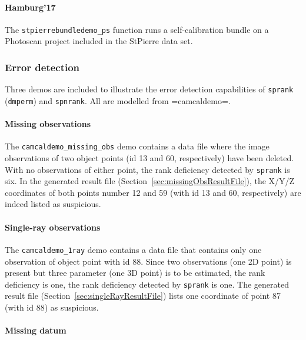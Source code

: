 \documentclass{article}
\begin{document}
\paragraph{\sc Hamburg'17}
The \texttt{stpierrebundledemo\_ps} function runs a self-calibration
bundle on a Photoscan project included in the StPierre data set.

\subsubsection{Error detection}

Three demos are included to illustrate the error detection
capabilities of \texttt{sprank} (\texttt{dmperm}) and
\texttt{spnrank}. All are modelled from =camcaldemo=.

\paragraph{Missing observations}

The \texttt{camcaldemo\_missing\_obs} demo contains a data file where
the image observations of two object points (id 13 and 60,
respectively) have been deleted. With no observations of either point,
the rank deficiency detected by \texttt{sprank} is six. In the
generated result file (Section~\ref{sec:missingObsResultFile}), the
X/Y/Z coordinates of both points number 12 and 59 (with id 13 and 60,
respectively) are indeed listed as suspicious.

\paragraph{Single-ray observations}

The \texttt{camcaldemo\_1ray} demo contains a data file that contains
only one observation of object point with id 88. Since two
observations (one 2D point) is present but three parameter (one 3D
point) is to be estimated, the rank deficiency is one, the rank
deficiency detected by \texttt{sprank} is one. The generated result
file (Section~\ref{sec:singleRayResultFile}) lists one coordinate of
point 87 (with id 88) as suspicious.

\paragraph{Missing datum}
\end{document}
